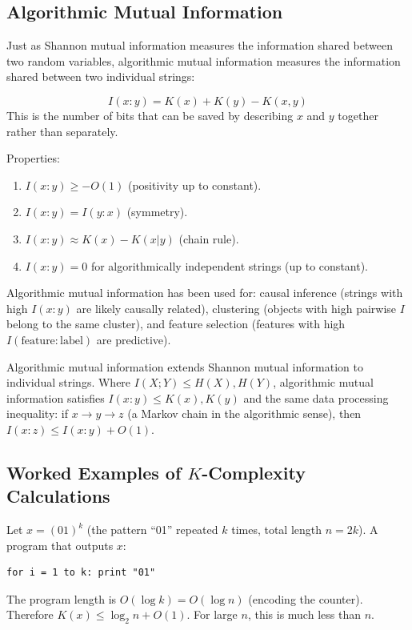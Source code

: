 \subsection{Algorithmic Mutual Information}
\label{sec:kolmogorov:mutual}

Just as Shannon mutual information measures the information shared between two random variables, algorithmic mutual information measures the information shared between two individual strings:

\begin{definition}
\[
I(x:y) = K(x) + K(y) - K(x,y)
\]
This is the number of bits that can be saved by describing $x$ and $y$ together rather than separately.
\end{definition}

Properties:
\begin{enumerate}
\item $I(x:y) \ge -O(1)$ (positivity up to constant).
\item $I(x:y) = I(y:x)$ (symmetry).
\item $I(x:y) \approx K(x) - K(x|y)$ (chain rule).
\item $I(x:y) = 0$ for algorithmically independent strings (up to constant).
\end{enumerate}

Algorithmic mutual information has been used for: causal inference (strings with high $I(x:y)$ are likely causally related), clustering (objects with high pairwise $I$ belong to the same cluster), and feature selection (features with high $I(\text{feature}:\text{label})$ are predictive).

Algorithmic mutual information extends Shannon mutual information to individual strings. Where $I(X;Y) \le H(X), H(Y)$, algorithmic mutual information satisfies $I(x:y) \le K(x), K(y)$ and the same data processing inequality: if $x \to y \to z$ (a Markov chain in the algorithmic sense), then $I(x:z) \le I(x:y) + O(1)$.

\subsection{Worked Examples of \texorpdfstring{$K$}{K}-Complexity Calculations}
\label{sec:kolmogorov:examples}

\begin{example}
Let $x = (01)^k$ (the pattern ``01'' repeated $k$ times, total length $n = 2k$). A program that outputs $x$:
\begin{verbatim}
for i = 1 to k: print "01"
\end{verbatim}
The program length is $O(\log k) = O(\log n)$ (encoding the counter). Therefore $K(x) \le \log_2 n + O(1)$. For large $n$, this is much less than $n$.
\end{example}

